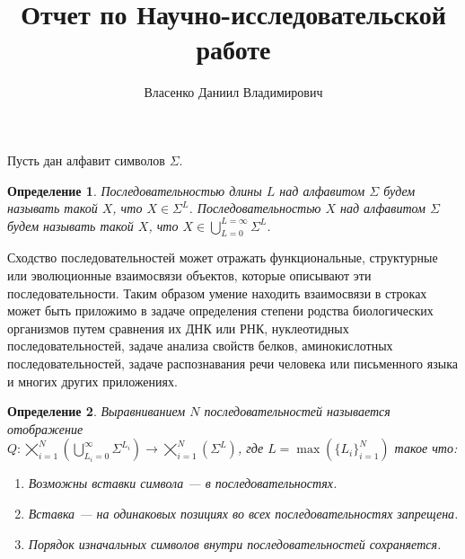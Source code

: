 \documentclass[specialist,
substylefile = spbu_report.rtx,
subf,href,colorlinks=true, 12pt]{disser}
\newtheorem{defenition}{Определение}
\begin{document}
	
	\title{Отчет по Научно-исследовательской работе}	
	\author{Власенко Даниил Владимирович}
	\date{\number\year}	
	\maketitle
	\tableofcontents
	
	
	\intro
		Пусть дан алфавит символов $\Sigma$. 
		\begin{defenition}Последовательностью длины $L$ над алфавитом $\Sigma$ будем называть такой $X$, что $X \in \Sigma^{L}$. Последовательностью $X$ над алфавитом $\Sigma$ будем называть такой $X$, что $X \in \bigcup_{L=0}^{L=\infty}\Sigma^{L}$.
		\end{defenition}
		
		Сходство последовательностей может отражать функциональные, структурные или эволюционные взаимосвязи объектов, которые описывают эти последовательности. Таким образом умение находить взаимосвязи в строках может быть приложимо в задаче определения степени родства биологических организмов путем сравнения их ДНК или РНК, нуклеотидных последовательностей, задаче анализа свойств белков, аминокислотных последовательностей, задаче распознавания речи человека или письменного языка и многих других приложениях. 
		
		\begin{defenition}
			Выравниванием $N$ последовательностей называется отображение \\$Q: \bigtimes_{i=1}^{N}(\bigcup_{L_i=0}^{\infty} \Sigma^{L_i}) \rightarrow \bigtimes_{i=1}^{N}(\Sigma^{L})$, где $L = \max(\{L_i\}_{i=1}^{N})$ такое что:
			\begin{enumerate}
				\item Возможны вставки символа --- в последовательностях.
				\item Вставка --- на одинаковых позициях во всех последовательностях запрещена.
				\item Порядок изначальных символов внутри последовательностей сохраняется.
			\end{enumerate}
		\end{defenition}		
		
\end{document}
